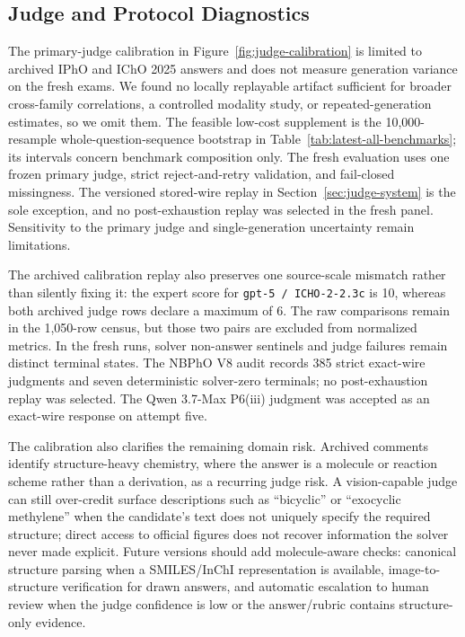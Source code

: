\documentclass[11pt]{article}
\begin{document}
\subsection{Judge and Protocol Diagnostics}
The primary-judge calibration in Figure~\ref{fig:judge-calibration} is limited to archived IPhO and IChO 2025 answers and does not measure generation variance on the fresh exams.
We found no locally replayable artifact sufficient for broader cross-family correlations, a controlled modality study, or repeated-generation estimates, so we omit them. The feasible low-cost supplement is the 10,000-resample whole-question-sequence bootstrap in Table~\ref{tab:latest-all-benchmarks}; its intervals concern benchmark composition only.
The fresh evaluation uses one frozen primary judge, strict reject-and-retry validation, and fail-closed missingness. The versioned stored-wire replay in Section~\ref{sec:judge-system} is the sole exception, and no post-exhaustion replay was selected in the fresh panel.
Sensitivity to the primary judge and single-generation uncertainty remain limitations.

The archived calibration replay also preserves one source-scale mismatch rather than silently fixing it: the expert score for \texttt{gpt-5 / ICHO-2-2.3c} is 10, whereas both archived judge rows declare a maximum of 6. The raw comparisons remain in the 1,050-row census, but those two pairs are excluded from normalized metrics. In the fresh runs, solver non-answer sentinels and judge failures remain distinct terminal states. The NBPhO V8 audit records 385 strict exact-wire judgments and seven deterministic solver-zero terminals; no post-exhaustion replay was selected. The Qwen 3.7-Max P6(iii) judgment was accepted as an exact-wire response on attempt five.

The calibration also clarifies the remaining domain risk.
Archived comments identify structure-heavy chemistry, where the answer is a molecule or reaction scheme rather than a derivation, as a recurring judge risk.
A vision-capable judge can still over-credit surface descriptions such as ``bicyclic'' or ``exocyclic methylene'' when the candidate's text does not uniquely specify the required structure; direct access to official figures does not recover information the solver never made explicit.
Future versions should add molecule-aware checks: canonical structure parsing when a SMILES/InChI representation is available, image-to-structure verification for drawn answers, and automatic escalation to human review when the judge confidence is low or the answer/rubric contains structure-only evidence.
\end{document}
